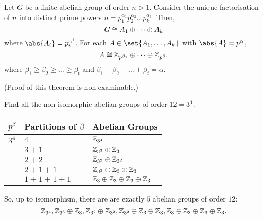 \documentclass[11pt]{penrose}
\begin{document}
\begin{nthm}
    Let $G$ be a finite abelian group of order $n > 1$. Consider the unique factorisation of $n$ into distinct prime powers $n = p_{1}^{\alpha_{1}} p_{2}^{\alpha_{2}} \dots p_{k}^{\alpha_{k}}$. Then,
    \begin{equation*}
        G \mathrel{\cong} A_{1} \oplus \dots \oplus A_{k}
    \end{equation*}
    where $\abs{A_{i}} = p_{i}^{\alpha^{i}}$. For each $A \in \set{A_{1}, \dots, A_{k}}$ with $\abs{A} = p^{\alpha}$,
    \begin{equation*}
        A \mathrel{\cong} \mathbb{Z}_{p^{\beta_{1}}} \oplus \dots \oplus \mathbb{Z}_{p^{\beta_{t}}}
    \end{equation*}
    where $\beta_{1} \geq \beta_{2} \geq \dots \geq \beta_{t}$ and $\beta_{1} + \beta_{2} + \dots + \beta_{t} = \alpha$.
\end{nthm}
(Proof of this theorem is non-examinable.)

\begin{negg}
    Find all the non-isomorphic abelian groups of order $12 = 3^{4}$.
    \begin{center}
        \begin{tabularx}{0.66\textwidth}{p{8mm}XX}
            \toprule
            $p^{\beta}$ & Partitions of $\beta$ & Abelian Groups\\
            \midrule
            $3^{4}$ & $4$ & $\mathbb{Z}_{3^{4}}$ \\
                    & $3+1$ & $\mathbb{Z}_{3^{3}} \oplus \mathbb{Z}_{3}$ \\
                    & $2+2$ & $\mathbb{Z}_{3^{2}} \oplus \mathbb{Z}_{3^{2}}$ \\
                    & $2+1+1$ & $\mathbb{Z}_{3^{2}} \oplus \mathbb{Z}_{3} \oplus \mathbb{Z}_{3}$ \\
                    & $1+1+1+1$ & $\mathbb{Z}_{3} \oplus \mathbb{Z}_{3} \oplus \mathbb{Z}_{3} \oplus \mathbb{Z}_{3}$ \\
            \bottomrule
        \end{tabularx}
    \end{center}
    So, up to isomorphism, there are are exactly $5$ abelian groups of order $12$:
    \begin{equation*}
        \mathbb{Z}_{3^{4}}, \mathbb{Z}_{3^{3}} \oplus \mathbb{Z}_{3}, \mathbb{Z}_{3^{2}} \oplus \mathbb{Z}_{3^{2}}, \mathbb{Z}_{3^{2}} \oplus \mathbb{Z}_{3} \oplus \mathbb{Z}_{3}, \mathbb{Z}_{3} \oplus \mathbb{Z}_{3} \oplus \mathbb{Z}_{3} \oplus \mathbb{Z}_{3}.
    \end{equation*}
\end{negg}
\end{document}
